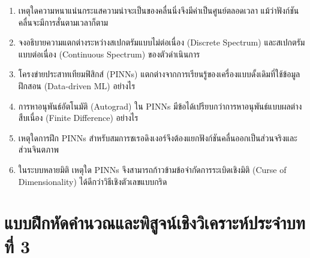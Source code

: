 \begin{enumerate}
    \item เหตุใดความหนาแน่นกระแสความน่าจะเป็นของคลื่นนิ่งจึงมีค่าเป็นศูนย์ตลอดเวลา แม้ว่าฟังก์ชันคลื่นจะมีการสั่นตามเวลาก็ตาม
    \item จงอธิบายความแตกต่างระหว่างสเปกตรัมแบบไม่ต่อเนื่อง (Discrete Spectrum) และสเปกตรัมแบบต่อเนื่อง (Continuous Spectrum) ของตัวดำเนินการ
    \item โครงข่ายประสาทเทียมฟิสิกส์ (PINNs) แตกต่างจากการเรียนรู้ของเครื่องแบบดั้งเดิมที่ใช้ข้อมูลฝึกสอน (Data-driven ML) อย่างไร
    \item การหาอนุพันธ์อัตโนมัติ (Autograd) ใน PINNs มีข้อได้เปรียบกว่าการหาอนุพันธ์แบบผลต่างสืบเนื่อง (Finite Difference) อย่างไร
    \item เหตุใดการฝึก PINNs สำหรับสมการชเรอดิงเงอร์จึงต้องแยกฟังก์ชันคลื่นออกเป็นส่วนจริงและส่วนจินตภาพ
    \item ในระบบหลายมิติ เหตุใด PINNs จึงสามารถก้าวข้ามข้อจำกัดการระเบิดเชิงมิติ (Curse of Dimensionality) ได้ดีกว่าวิธีเชิงตัวเลขแบบกริด
\end{enumerate}

\section{แบบฝึกหัดคำนวณและพิสูจน์เชิงวิเคราะห์ประจำบทที่ 3}

